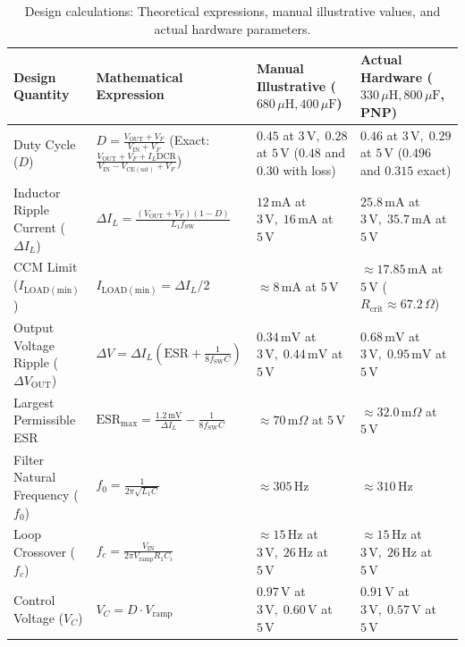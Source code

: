 \documentclass[11pt,a4paper]{article}
\begin{document}
\begin{table}[H]
\centering
\small
\caption{Design calculations: Theoretical expressions, manual illustrative values, and actual hardware parameters.}
\label{tab:design_calc}
\begin{tabular}{@{}p{3.1cm}p{4.5cm}p{3.7cm}p{4.2cm}@{}}
\toprule
\textbf{Design Quantity} & \textbf{Mathematical Expression} & \textbf{Manual Illustrative ($680\,\mu\mathrm{H}, 400\,\mu\mathrm{F}$)} & \textbf{Actual Hardware ($330\,\mu\mathrm{H}, 800\,\mu\mathrm{F}$, PNP)} \\ \midrule
Duty Cycle ($D$) & $D = \frac{V_{\mathrm{OUT}} + V_F}{V_{\mathrm{IN}} + V_F}$ \newline (Exact: $\frac{V_{\mathrm{OUT}} + V_F + I_L \mathrm{DCR}}{V_{\mathrm{IN}} - V_{\mathrm{CE(sat)}} + V_F}$) & $0.45$ at $3\,\mathrm{V},\; 0.28$ at $5\,\mathrm{V}$ \newline ($0.48$ and $0.30$ with loss) & $0.46$ at $3\,\mathrm{V},\; 0.29$ at $5\,\mathrm{V}$ \newline ($0.496$ and $0.315$ exact) \\ \addlinespace
Inductor Ripple Current ($\Delta I_L$) & $\Delta I_L = \frac{(V_{\mathrm{OUT}} + V_F)(1 - D)}{L_1 f_{\mathrm{SW}}}$ & $12\,\mathrm{mA}$ at $3\,\mathrm{V},\; 16\,\mathrm{mA}$ at $5\,\mathrm{V}$ & $25.8\,\mathrm{mA}$ at $3\,\mathrm{V},\; 35.7\,\mathrm{mA}$ at $5\,\mathrm{V}$ \\ \addlinespace
CCM Limit ($I_{\mathrm{LOAD(min)}}$) & $I_{\mathrm{LOAD(min)}} = \Delta I_L / 2$ & $\approx 8\,\mathrm{mA}$ at $5\,\mathrm{V}$ & $\approx 17.85\,\mathrm{mA}$ at $5\,\mathrm{V}$ ($R_{\mathrm{crit}} \approx 67.2\,\Omega$) \\ \addlinespace
Output Voltage Ripple ($\Delta V_{\mathrm{OUT}}$) & $\Delta V = \Delta I_L \left(\mathrm{ESR} + \frac{1}{8 f_{\mathrm{SW}} C}\right)$ & $0.34\,\mathrm{mV}$ at $3\,\mathrm{V},\; 0.44\,\mathrm{mV}$ at $5\,\mathrm{V}$ & $0.68\,\mathrm{mV}$ at $3\,\mathrm{V},\; 0.95\,\mathrm{mV}$ at $5\,\mathrm{V}$ \\ \addlinespace
Largest Permissible ESR & $\mathrm{ESR}_{\mathrm{max}} = \frac{1.2\,\mathrm{mV}}{\Delta I_L} - \frac{1}{8 f_{\mathrm{SW}} C}$ & $\approx 70\,\mathrm{m}\Omega$ at $5\,\mathrm{V}$ & $\approx 32.0\,\mathrm{m}\Omega$ at $5\,\mathrm{V}$ \\ \addlinespace
Filter Natural Frequency ($f_0$) & $f_0 = \frac{1}{2\pi \sqrt{L_1 C}}$ & $\approx 305\,\mathrm{Hz}$ & $\approx 310\,\mathrm{Hz}$ \\ \addlinespace
Loop Crossover ($f_c$) & $f_c = \frac{V_{\mathrm{IN}}}{2\pi V_{\mathrm{ramp}} R_1 C_i}$ & $\approx 15\,\mathrm{Hz}$ at $3\,\mathrm{V},\; 26\,\mathrm{Hz}$ at $5\,\mathrm{V}$ & $\approx 15\,\mathrm{Hz}$ at $3\,\mathrm{V},\; 26\,\mathrm{Hz}$ at $5\,\mathrm{V}$ \\ \addlinespace
Control Voltage ($V_C$) & $V_C = D \cdot V_{\mathrm{ramp}}$ & $0.97\,\mathrm{V}$ at $3\,\mathrm{V},\; 0.60\,\mathrm{V}$ at $5\,\mathrm{V}$ & $0.91\,\mathrm{V}$ at $3\,\mathrm{V},\; 0.57\,\mathrm{V}$ at $5\,\mathrm{V}$ \\ \bottomrule
\end{tabular}
\end{table}
\end{document}
